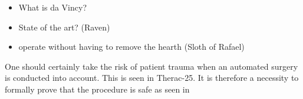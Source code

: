 \begin{itemize}
\item What is da Vincy?
\item State of the art? (Raven)
\item operate without having to remove the hearth (Sloth of Rafael)
\end{itemize}
One should certainly take the risk of patient trauma when an automated surgery is conducted into account. This is seen in Therac-25. It is therefore a necessity to formally prove that the procedure is safe as seen in \citep{bib:safety}